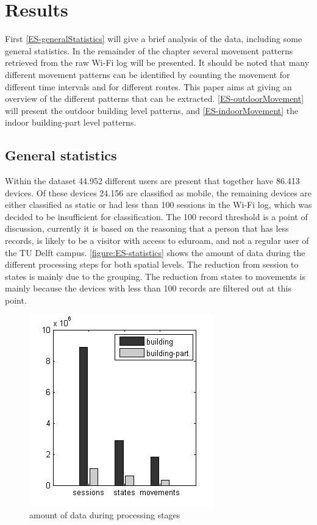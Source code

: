 \section{Results}\label{3-results}
First \autoref{ES-generalStatistics} will give a brief analysis of the data, including some general statistics. In the remainder of the chapter several movement patterns retrieved from the raw Wi-Fi log will be presented. It should be noted that many different movement patterns can be identified by counting the movement for different time intervals and for different routes. This paper aims at giving an overview of the different patterns that can be extracted. \autoref{ES-outdoorMovement} will present the outdoor building level patterns, and \autoref{ES-indoorMovement} the indoor building-part level patterns.

\subsection{General statistics}\label{ES-generalStatistics}
Within the dataset 44.952 different users are present that together have 86.413 devices. Of these devices 24.156 are classified as mobile, the remaining devices are either classified as static or had less than 100 sessions in the Wi-Fi log, which was decided to be insufficient for classification. The 100 record threshold is a point of discussion, currently it is based on the reasoning that a person that has less records, is likely to be a visitor with access to eduroam, and not a regular user of the TU Delft campus. \autoref{figure:ES-statistics} shows the amount of data during the different processing steps for both spatial levels. The reduction from session to states is mainly due to the grouping. The reduction from states to movements is mainly because the devices with less than 100 records are filtered out at this point.

\begin{figure}[H]
\centering
\includegraphics[scale=0.5]{ES-statistics.jpg}
\captionsetup{justification=centering}
\caption{amount of data during processing stages}
\label{figure:ES-statistics}
\end{figure}

